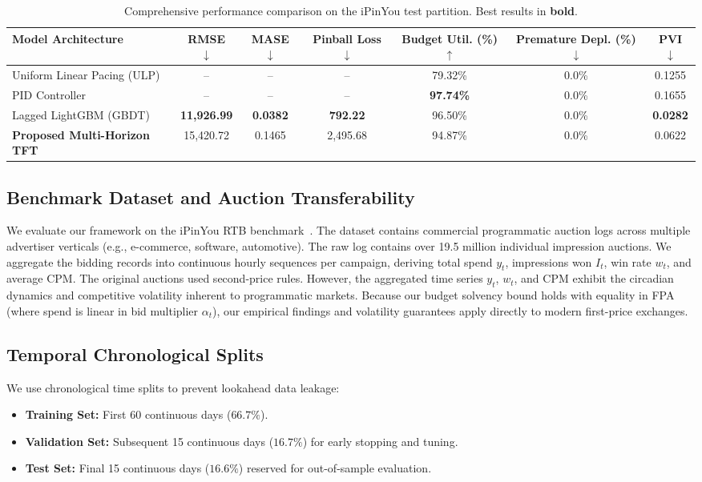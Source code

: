 \documentclass[sigconf]{acmart}
\begin{document}
\begin{table}[t]
  \centering
  \caption{Comprehensive performance comparison on the iPinYou test partition. Best results in \textbf{bold}.}
  \label{tab:main_results}
  \small
  \begin{tabular}{lcccccc}
    \toprule
    \textbf{Model Architecture} & \textbf{RMSE} $\downarrow$ & \textbf{MASE} $\downarrow$ & \textbf{Pinball Loss} $\downarrow$ & \textbf{Budget Util. (\%)} $\uparrow$ & \textbf{Premature Depl. (\%)} $\downarrow$ & \textbf{PVI} $\downarrow$ \\
    \midrule
    Uniform Linear Pacing (ULP) & -- & -- & -- & 79.32\% & 0.0\% & 0.1255 \\
    PID Controller & -- & -- & -- & \textbf{97.74\%} & 0.0\% & 0.1655 \\
    Lagged LightGBM (GBDT) & \textbf{11,926.99} & \textbf{0.0382} & \textbf{792.22} & 96.50\% & 0.0\% & \textbf{0.0282} \\
    \textbf{Proposed Multi-Horizon TFT} & 15,420.72 & 0.1465 & 2,495.68 & 94.87\% & 0.0\% & 0.0622 \\
    \bottomrule
  \end{tabular}
\end{table}

\subsection{Benchmark Dataset and Auction Transferability}
We evaluate our framework on the iPinYou RTB benchmark~\cite{zhang2015statistical}. The dataset contains commercial programmatic auction logs across multiple advertiser verticals (e.g., e-commerce, software, automotive). The raw log contains over 19.5 million individual impression auctions. We aggregate the bidding records into continuous hourly sequences per campaign, deriving total spend $y_t$, impressions won $I_t$, win rate $w_t$, and average CPM. The original auctions used second-price rules. However, the aggregated time series $y_t$, $w_t$, and CPM exhibit the circadian dynamics and competitive volatility inherent to programmatic markets. Because our budget solvency bound holds with equality in FPA (where spend is linear in bid multiplier $\alpha_t$), our empirical findings and volatility guarantees apply directly to modern first-price exchanges.

\subsection{Temporal Chronological Splits}
We use chronological time splits to prevent lookahead data leakage:
\begin{itemize}
  \item \textbf{Training Set:} First 60 continuous days ($66.7\%$).
  \item \textbf{Validation Set:} Subsequent 15 continuous days ($16.7\%$) for early stopping and tuning.
  \item \textbf{Test Set:} Final 15 continuous days ($16.6\%$) reserved for out-of-sample evaluation.
\end{itemize}
\end{document}
